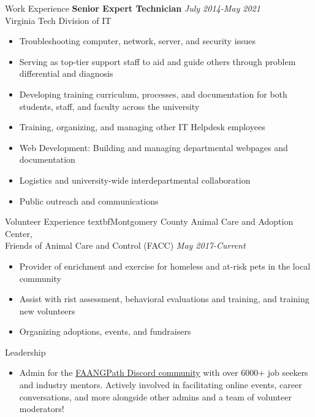\documentclass{resume} %
\begin{document}
\begin{rSection}{Work Experience}
  \textbf{Senior Expert Technician} \hfill \textit{July 2014-May 2021} \\
  Virginia Tech Division of IT
   \begin{itemize}
      \itemsep -3pt {} 
       \item Troubleshooting computer, network, server, and security issues
       \item Serving as top-tier support staff to aid and guide others through problem differential and diagnosis
       \item Developing training curriculum, processes, and documentation for both students, staff, and faculty across the university
       \item Training, organizing, and managing other IT Helpdesk employees
       \item Web Development: Building and managing departmental webpages and documentation
       \item Logistics and university-wide interdepartmental collaboration
       \item Public outreach and communications
   \end{itemize}

\end{rSection} 

\begin{rSection}{Volunteer Experience} 
    textbf{Montgomery County Animal Care and Adoption Center, \\ Friends of Animal Care and Control (FACC)} \hfill \textit{May 2017-Current}
\begin{itemize}
    \item 	Provider of enrichment and exercise for homeless and at-risk pets in the local community
    \item Assist with rist assessment, behavioral evaluations and training, and training new volunteers
    \item Organizing adoptions, events, and fundraisers
\end{itemize}


\end{rSection}

\begin{rSection}{Leadership} 
\begin{itemize}
    \item Admin for the \href{https://discord.com/invite/WWbjEaZ}{FAANGPath Discord community} with over 6000+ job seekers and industry mentors. Actively involved in facilitating online events, career conversations, and more alongside other admins and a team of volunteer moderators! 
\end{itemize}


\end{rSection}
\end{document}
